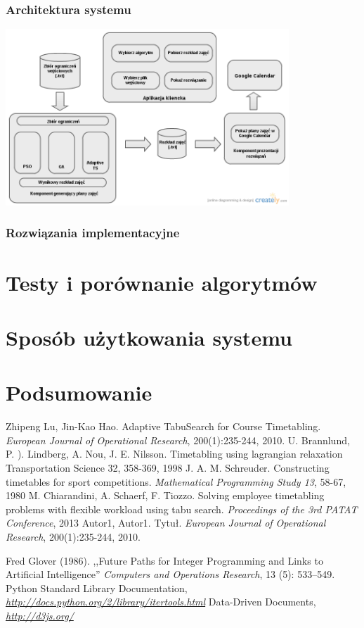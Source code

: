 \documentclass[11pt]{report}
\begin{document}
\subsection{Architektura systemu}

\par
\includegraphics[width=0.8\textwidth]{ComponentsDiagram.png}
\subsection{Rozwiązania implementacyjne}
\chapter{Testy i porównanie algorytmów}

\chapter{Sposób użytkowania systemu}
\chapter{Podsumowanie}

\begin{thebibliography}{2}
 Zhipeng Lu, Jin-Kao Hao. Adaptive TabuSearch for Course Timetabling.  \emph{European Journal of Operational Research}, 200(1):235-244, 2010.
 U. Brannlund, P. ). Lindberg, A. Nou, J. E. Nilsson. Timetabling using lagrangian relaxation Transportation Science 32, 358-369, 1998
 J. A. M. Schreuder. Constructing timetables for sport competitions. \emph{Mathematical Programming Study 13}, 58-67, 1980
 M. Chiarandini, A. Schaerf, F. Tiozzo. Solving employee timetabling problems with flexible workload using tabu search. \emph{Proceedings of the 3rd PATAT Conference}, 2013
 Autor1, Autor1. Tytuł.  \emph{European Journal of Operational Research}, 200(1):235-244, 2010.

 Fred Glover (1986). ,,Future Paths for Integer Programming and Links to Artificial Intelligence'' \emph{Computers and Operations Research}, 13 (5): 533–549.
 Python Standard Library Documentation, \emph{\url{http://docs.python.org/2/library/itertools.html}}
 Data-Driven Documents, \emph{\url{http://d3js.org/}}
\end{thebibliography}
\end{document}
